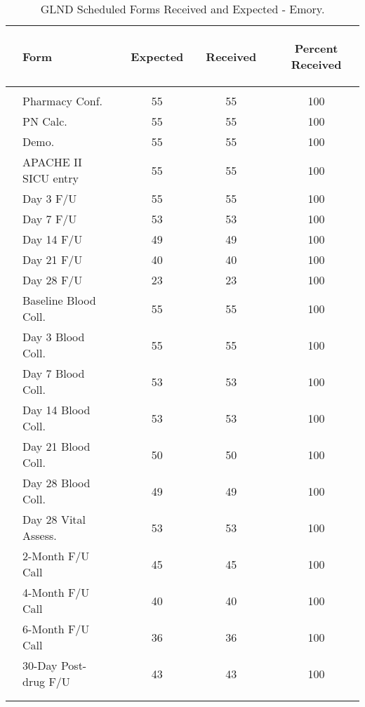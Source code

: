 \documentclass[dvips, 10pt]{article}
\begin{document}
\begin{table}[t]
\caption
{ GLND Scheduled Forms Received and Expected - Emory. }
\begin{center}
\begin{tabular}{ @{}l@{}
@{}l@{}@{}p{1.5em}@{}@{}c@{}@{}p{1.5em}@{}@{}c@{}@{}p{1.5em}@{}@{}c@{}
}
\hline

& \parbox{6em}{\begin{center}Form\end{center}} && \parbox{6em}{\begin{center}Expected\end{center}} && \parbox{6em}{\begin{center}Received\end{center}} && \parbox{6em}{\begin{center}Percent Received\end{center}} \\

\hline

\\
& Pharmacy Conf. && 55 && 55 && 100 \\
& PN Calc. && 55 && 55 && 100 \\
& Demo. && 55 && 55 && 100 \\
& APACHE II SICU entry && 55 && 55 && 100 \\
& Day 3 F/U && 55 && 55 && 100 \\
& Day 7 F/U && 53 && 53 && 100 \\
& Day 14 F/U && 49 && 49 && 100 \\
& Day 21 F/U && 40 && 40 && 100 \\
& Day 28 F/U && 23 && 23 && 100 \\
& Baseline Blood Coll. && 55 && 55 && 100 \\
& Day 3 Blood Coll. && 55 && 55 && 100 \\
& Day 7 Blood Coll. && 53 && 53 && 100 \\
& Day 14 Blood Coll. && 53 && 53 && 100 \\
& Day 21 Blood Coll. && 50 && 50 && 100 \\
& Day 28 Blood Coll. && 49 && 49 && 100 \\
& Day 28 Vital Assess. && 53 && 53 && 100 \\
& 2-Month F/U Call && 45 && 45 && 100 \\
& 4-Month F/U Call && 40 && 40 && 100 \\
& 6-Month F/U Call && 36 && 36 && 100 \\
& 30-Day Post-drug F/U && 43 && 43 && 100 \\
\\
\hline \\

\end{tabular}

\end{center}
 \end{table}
\end{document}
